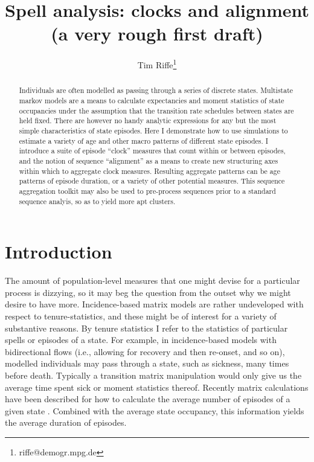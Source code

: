 \documentclass{article}
\begin{document}
\title{Spell analysis: clocks and alignment \\ (a very rough first draft)}
\author[1]{Tim Riffe\thanks{riffe@demogr.mpg.de}}
\maketitle

\begin{abstract}
Individuals are often modelled as passing through a series of discrete
states. Multistate markov models are a means to calculate expectancies and
moment statistics of state occupancies under the assumption that the transition
rate schedules between states are held fixed. There are however no handy
analytic expressions for any but the most simple characteristics of state episodes. Here
I demonstrate how to use simulations to estimate a variety of age and other
macro patterns of different state episodes. I introduce a
suite of episode ``clock'' measures that count within or between episodes, and the notion of
sequence ``alignment'' as a means to create new structuring axes within which to
aggregate clock measures. Resulting aggregate patterns can be age patterns of
episode duration, or a variety of other potential measures. This sequence
aggregation toolkit may also be used to pre-process sequences prior to a
standard sequence analyis, so as to yield more apt clusters. 
\end{abstract}

\section{Introduction}
The amount of population-level measures that one might devise for a particular
process is dizzying, so it may beg the question from the outset
why we might desire to have more. Incidence-based matrix
models are rather undeveloped with respect to tenure-statistics, and these
might be of interest for a variety of substantive reasons. By tenure statistics I
refer to the statistics of particular spells or episodes of a state. For
example, in incidence-based models with bidirectional flows (i.e., allowing for
recovery and then re-onset, and so on), modelled individuals may pass through a state,
such as sickness, many times before death. Typically a transition matrix
manipulation would only give us the average time spent sick or moment statistics
thereof. Recently matrix calculations have been described for how to calculate the average number of episodes of a given state \citep{dudel2017b}.
Combined with the average state occupancy, this information yields the average
duration of episodes.
\end{document}
